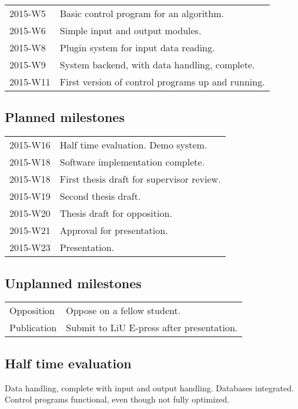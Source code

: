 \documentclass[11pt]{article}
\begin{document}
\begin{tabular}{l l}
    2015-W5     & Basic control program for an algorithm.  \\
    2015-W6     & Simple input and output modules.  \\
    2015-W8     & Plugin system for input data reading.  \\
    2015-W9     & System backend, with data handling, complete.  \\
    2015-W11    & First version of control programs up and running. \\
\end{tabular}

\subsection*{Planned milestones}

\begin{tabular}{l l}
    2015-W16    & Half time evaluation. Demo system. \\
    2015-W18    & Software implementation complete. \\
    2015-W18    & First thesis draft for supervisor review. \\
    2015-W19    & Second thesis draft. \\
    2015-W20    & Thesis draft for opposition. \\
    2015-W21    & Approval for presentation. \\
    2015-W23    & Presentation. \\
\end{tabular}

\subsection*{Unplanned milestones}

\begin{tabular}{l l}
    Opposition  & Oppose on a fellow student. \\
    Publication  & Submit to LiU E-press after presentation. \\
\end{tabular}

\subsection*{Half time evaluation}

Data handling, complete with input and output handling. Databases integrated. Control programs functional, even though not fully optimized.
\end{document}
